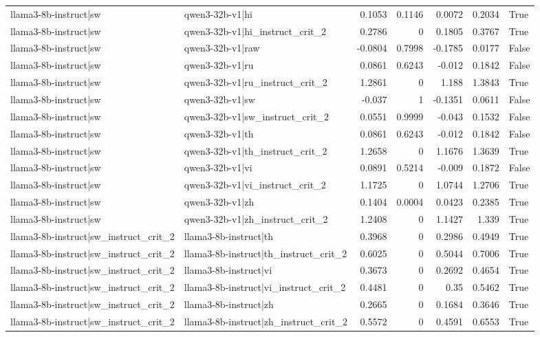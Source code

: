 \begin{table}
\begin{tabular}{l l r r r r l}
llama3-8b-instruct|sw & qwen3-32b-v1|hi & 0.1053 & 0.1146 & 0.0072 & 0.2034 & True \\
llama3-8b-instruct|sw & qwen3-32b-v1|hi_instruct_crit_2 & 0.2786 & 0 & 0.1805 & 0.3767 & True \\
llama3-8b-instruct|sw & qwen3-32b-v1|raw & -0.0804 & 0.7998 & -0.1785 & 0.0177 & False \\
llama3-8b-instruct|sw & qwen3-32b-v1|ru & 0.0861 & 0.6243 & -0.012 & 0.1842 & False \\
llama3-8b-instruct|sw & qwen3-32b-v1|ru_instruct_crit_2 & 1.2861 & 0 & 1.188 & 1.3843 & True \\
llama3-8b-instruct|sw & qwen3-32b-v1|sw & -0.037 & 1 & -0.1351 & 0.0611 & False \\
llama3-8b-instruct|sw & qwen3-32b-v1|sw_instruct_crit_2 & 0.0551 & 0.9999 & -0.043 & 0.1532 & False \\
llama3-8b-instruct|sw & qwen3-32b-v1|th & 0.0861 & 0.6243 & -0.012 & 0.1842 & False \\
llama3-8b-instruct|sw & qwen3-32b-v1|th_instruct_crit_2 & 1.2658 & 0 & 1.1676 & 1.3639 & True \\
llama3-8b-instruct|sw & qwen3-32b-v1|vi & 0.0891 & 0.5214 & -0.009 & 0.1872 & False \\
llama3-8b-instruct|sw & qwen3-32b-v1|vi_instruct_crit_2 & 1.1725 & 0 & 1.0744 & 1.2706 & True \\
llama3-8b-instruct|sw & qwen3-32b-v1|zh & 0.1404 & 0.0004 & 0.0423 & 0.2385 & True \\
llama3-8b-instruct|sw & qwen3-32b-v1|zh_instruct_crit_2 & 1.2408 & 0 & 1.1427 & 1.339 & True \\
llama3-8b-instruct|sw_instruct_crit_2 & llama3-8b-instruct|th & 0.3968 & 0 & 0.2986 & 0.4949 & True \\
llama3-8b-instruct|sw_instruct_crit_2 & llama3-8b-instruct|th_instruct_crit_2 & 0.6025 & 0 & 0.5044 & 0.7006 & True \\
llama3-8b-instruct|sw_instruct_crit_2 & llama3-8b-instruct|vi & 0.3673 & 0 & 0.2692 & 0.4654 & True \\
llama3-8b-instruct|sw_instruct_crit_2 & llama3-8b-instruct|vi_instruct_crit_2 & 0.4481 & 0 & 0.35 & 0.5462 & True \\
llama3-8b-instruct|sw_instruct_crit_2 & llama3-8b-instruct|zh & 0.2665 & 0 & 0.1684 & 0.3646 & True \\
llama3-8b-instruct|sw_instruct_crit_2 & llama3-8b-instruct|zh_instruct_crit_2 & 0.5572 & 0 & 0.4591 & 0.6553 & True \\

\end{tabular}
\end{table}
